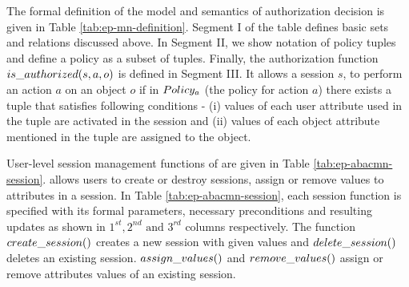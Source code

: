 	
	
	The formal definition of the model and semantics of authorization  decision is given in Table \ref{tab:ep-mn-definition}. Segment I of the table defines basic sets and relations discussed above. In Segment II, we show notation of policy tuples and define a policy as a subset of tuples. Finally, the authorization function $is\_authorized(s,a,o)$ is defined in Segment III.  It allows a session $s$, to perform an action $a$ on an object $o$ if in $Policy_a$ (the policy for action $a$)  there exists a tuple that satisfies following conditions - (i) values of each user attribute used in the tuple are activated in the session and (ii) values of each object attribute mentioned in the tuple are assigned to  the object.
	
	
	User-level session management functions of \EPMNModel{} are given in Table \ref{tab:ep-abacmn-session}. \EPMNModel{} allows users to create or destroy sessions, assign or remove values to attributes in a session.  In Table \ref{tab:ep-abacmn-session}, each session function is specified with its formal parameters, necessary preconditions and resulting updates as shown in $1^{st}, 2^{nd} \text{ and }  3^{rd}$ columns respectively. The function $create\_session()$ creates a new session with given values and $delete\_session()$ deletes an existing session.  $assign\_values()$ and $remove\_values()$  assign or remove attributes values of an existing session.
	
